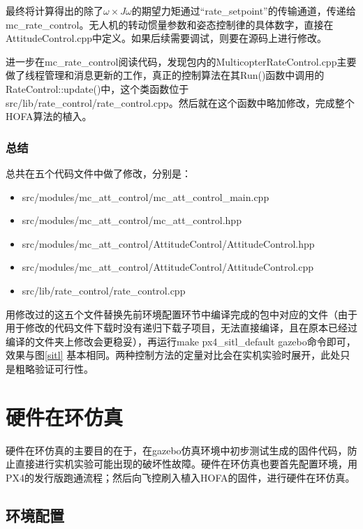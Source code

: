 最终将计算得出的除了$\omega \times J\omega$的期望力矩通过“rate\_setpoint”的传输通道，传递给mc\_rate\_control。无人机的转动惯量参数和姿态控制律的具体数字，直接在AttitudeControl.cpp中定义。如果后续需要调试，则要在源码上进行修改。

进一步在mc\_rate\_control阅读代码，发现包内的MulticopterRateControl.cpp主要做了线程管理和消息更新的工作，真正的控制算法在其Run()函数中调用的RateControl::update()中，这个类函数位于src/lib/rate\_control/rate\_control.cpp。然后就在这个函数中略加修改，完成整个HOFA算法的植入。

\subsubsection*{总结}

总共在五个代码文件中做了修改，分别是：
\begin{itemize}
  \item src/modules/mc\_att\_control/mc\_att\_control\_main.cpp
  \item src/modules/mc\_att\_control/mc\_att\_control.hpp
  \item src/modules/mc\_att\_control/AttitudeControl/AttitudeControl.hpp
  \item src/modules/mc\_att\_control/AttitudeControl/AttitudeControl.cpp
  \item src/lib/rate\_control/rate\_control.cpp
\end{itemize}

用修改过的这五个文件替换先前环境配置环节中编译完成的包中对应的文件（由于用于修改的代码文件下载时没有递归下载子项目，无法直接编译，且在原本已经过编译的文件夹上修改会更稳妥），再运行make px4\_sitl\_default gazebo命令即可，效果与图\ref{sitl} 基本相同。两种控制方法的定量对比会在实机实验时展开，此处只是粗略验证可行性。

\section{硬件在环仿真}
硬件在环仿真的主要目的在于，在gazebo仿真环境中初步测试生成的固件代码，防止直接进行实机实验可能出现的破坏性故障。硬件在环仿真也要首先配置环境，用PX4的发行版跑通流程；然后向飞控刷入植入HOFA的固件，进行硬件在环仿真。

\subsection*{环境配置}


